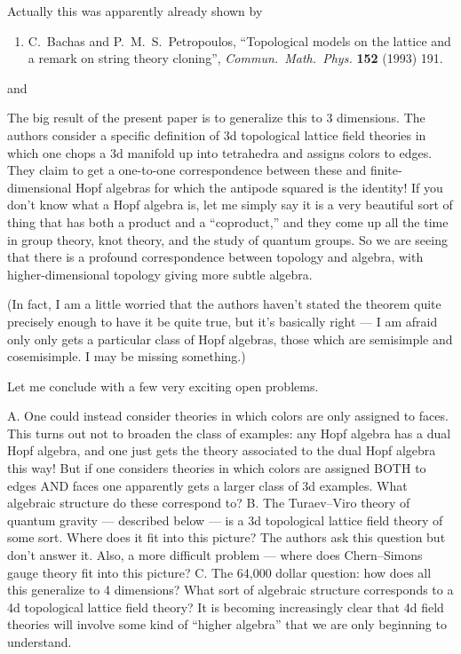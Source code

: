 \documentclass[12pt]{article}
\def\tightlist{}
\renewcommand{\texttt}[1]{%
  \begingroup
  \ttfamily
  \begingroup\lccode`~=`/\lowercase{\endgroup\def~}{/\discretionary{}{}{}}%
  \begingroup\lccode`~=`[\lowercase{\endgroup\def~}{[\discretionary{}{}{}}%
  \begingroup\lccode`~=`.\lowercase{\endgroup\def~}{.\discretionary{}{}{}}%
  \catcode`/=\active\catcode`[=\active\catcode`.=\active
  \scantokens{#1\noexpand}%
  \endgroup
}
\begin{document}
Actually this was apparently already shown by

\begin{enumerate}
\def\labelenumi{\arabic{enumi})}
\setcounter{enumi}{1}
\tightlist
\item
  C.\ Bachas and P.\ M.\ S.\ Petropoulos, ``Topological models on the lattice 
  and a remark on string theory cloning'', \emph{Commun.\ Math.\ Phys.}
  \textbf{152} (1993) 191.
\end{enumerate}

and


The big result of the present paper is to generalize this to 3
dimensions. The authors consider a specific definition of 3d topological
lattice field theories in which one chops a 3d manifold up into
tetrahedra and assigns colors to edges. They claim to get a one-to-one
correspondence between these and finite-dimensional Hopf algebras for
which the antipode squared is the identity! If you don't know what a
Hopf algebra is, let me simply say it is a very beautiful sort of thing
that has both a product and a ``coproduct,'' and they come up all the
time in group theory, knot theory, and the study of quantum groups. So
we are seeing that there is a profound correspondence between topology
and algebra, with higher-dimensional topology giving more subtle
algebra.

(In fact, I am a little worried that the authors haven't stated the
theorem quite precisely enough to have it be quite true, but it's
basically right --- I am afraid only only gets a particular class of
Hopf algebras, those which are semisimple and cosemisimple. I may be
missing something.)

Let me conclude with a few very exciting open problems.

A. One could instead consider theories in which colors are only assigned
to faces. This turns out not to broaden the class of examples: any Hopf
algebra has a dual Hopf algebra, and one just gets the theory associated
to the dual Hopf algebra this way! But if one considers theories in
which colors are assigned BOTH to edges AND faces one apparently gets a
larger class of 3d examples. What algebraic structure do these
correspond to? B. The Turaev--Viro theory of quantum gravity ---
described below --- is a 3d topological lattice field theory of some
sort. Where does it fit into this picture? The authors ask this question
but don't answer it. Also, a more difficult problem --- where does
Chern--Simons gauge theory fit into this picture? C. The 64,000 dollar
question: how does all this generalize to 4 dimensions? What sort of
algebraic structure corresponds to a 4d topological lattice field
theory? It is becoming increasingly clear that 4d field theories will
involve some kind of ``higher algebra'' that we are only beginning to
understand.
\end{document}
